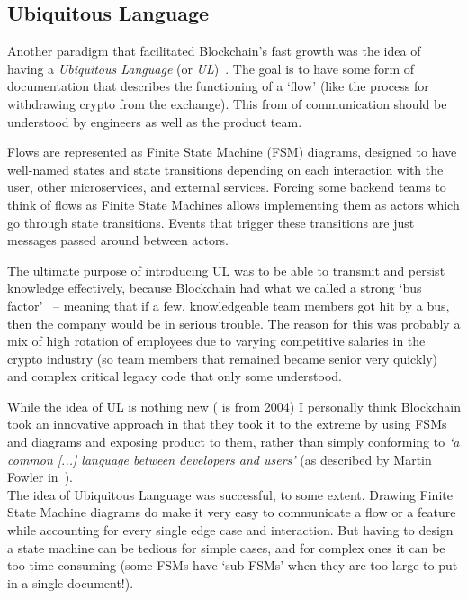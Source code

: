 \documentclass[conference]{IEEEtran}
\begin{document}
    \subsection{Ubiquitous Language}\label{subsec:ul}

    Another paradigm that facilitated Blockchain's fast growth was the idea of having a
    \emph{Ubiquitous Language} (or \emph{UL})~\cite{evansDomainDrivenDesignUL, fowlerUL}.
    The goal is to have some form of documentation that describes the functioning of a `flow' (like
    the process for withdrawing crypto from the exchange).
    This from of communication should be understood by engineers as well as the product team.

    Flows are represented as Finite State Machine (FSM) diagrams, designed to have well-named states and
    state transitions depending on each interaction with the user, other microservices, and external
    services.
    Forcing some backend teams to think of flows as Finite State Machines allows implementing
    them as actors which go through state transitions.
    Events that trigger these transitions are just messages passed around between actors.

    The ultimate purpose of introducing UL was to be able to transmit and persist knowledge
    effectively, because Blockchain had what we called a strong `bus
    factor'~\cite{bowlerTruckFactor} -- meaning that if a few, knowledgeable team members got hit by
    a bus, then the company would be in serious trouble.
    The reason for this was probably a mix of high rotation of employees due to varying competitive
    salaries in the crypto industry (so team members that remained became senior very quickly) and
    complex critical legacy code that only some understood.

    While the idea of UL is nothing new (\cite{evansDomainDrivenDesignUL} is from 2004) I personally
    think Blockchain took an innovative approach in that they took it to the extreme by using FSMs
    and diagrams and exposing product to them, rather than simply conforming to \emph{`a common [...]
        language between developers and users'} (as described by Martin Fowler in~\cite{fowlerUL}).\\

    The idea of Ubiquitous Language was successful, to some extent.
    Drawing Finite State Machine diagrams do make it very easy to communicate a flow or a feature while
    accounting for every single edge case and interaction.
    But having to design a state machine can be tedious for simple cases, and
    for complex ones it can be too time-consuming (some FSMs have `sub-FSMs' when they are too large
    to put in a single document!).
\end{document}
